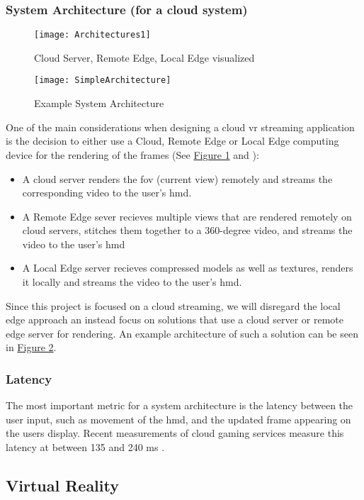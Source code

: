 \subsubsection{System Architecture (for a cloud system)}
\begin{figure}[h]
\caption{Cloud Server, Remote Edge, Local Edge visualized}
\label{fig:arch1}
\texttt{[image: Architectures1]}
\end{figure}

\begin{figure}[h]
\caption{Example System Architecture}
\label{fig:sysarch}
\texttt{[image: SimpleArchitecture]}
\end{figure}

One of the main considerations when designing a cloud \acrshort{vr} streaming application is the decision to either use a Cloud, Remote Edge or Local Edge computing device for the rendering of the frames (See \hyperref[fig:arch1]{Figure 1} and \cite{wlanvr}):
\begin{itemize}
\item A cloud server renders the \acrfull{fov} (current view) remotely and streams the corresponding video to the user’s \acrfull{hmd}. 
\item A Remote Edge sever recieves multiple views that are rendered remotely on cloud servers, stitches them together to a 360-degree video, and streams the video to the user’s \acrshort{hmd}
\item A Local Edge server recieves compressed models as well as textures, renders it locally and streams the video to the user’s \acrshort{hmd}.
\end{itemize} 

Since this project is focused on a cloud streaming, we will disregard the local edge approach an instead focus on solutions that use a cloud server or remote edge server for rendering. An example architecture of such a solution can be seen in \hyperref[fig:sysarch]{Figure 2}.
\subsubsection{Latency}
The most important metric for a system architecture is the latency between the user input, such as movement of the \acrshort{hmd}, and the updated frame appearing on the users display. Recent measurements of  cloud gaming services measure this latency at between 135 and 240 \acrshort{ms} \parencite{lagmeasure}.

\subsection{Virtual Reality}

